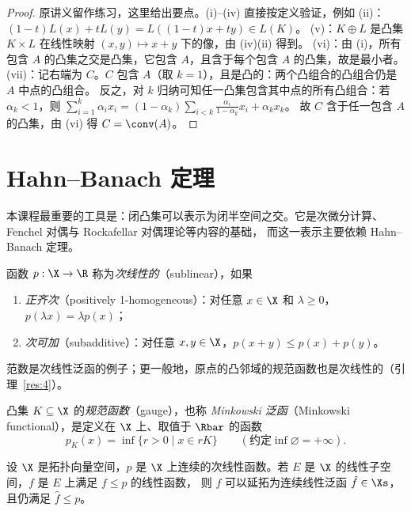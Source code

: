 \begin{proof}
原讲义留作练习，这里给出要点。(i)--(iv) 直接按定义验证，例如 (ii)：$(1-t)L(x)+tL(y)=L((1-t)x+ty)\in L(K)$。
(v)：$K\oplus L$ 是凸集 $K\times L$ 在线性映射 $(x,y)\mapsto x+y$ 下的像，由 (iv)(ii) 得到。
(vi)：由 (i)，所有包含 $A$ 的凸集之交是凸集，它包含 $A$，且含于每个包含 $A$ 的凸集，故是最小者。
(vii)：记右端为 $C$。$C$ 包含 $A$（取 $k=1$），且是凸的：两个凸组合的凸组合仍是 $A$ 中点的凸组合。
反之，对 $k$ 归纳可知任一凸集包含其中点的所有凸组合：若 $\alpha_k<1$，则
$\sum_{i=1}^k\alpha_ix_i=(1-\alpha_k)\sum_{i<k}\frac{\alpha_i}{1-\alpha_k}x_i+\alpha_kx_k$。
故 $C$ 含于任一包含 $A$ 的凸集，由 (vi) 得 $C=\conv(A)$。
\end{proof}

\section{Hahn--Banach 定理}

本课程最重要的工具是：闭凸集可以表示为闭半空间之交。它是次微分计算、Fenchel 对偶与 Rockafellar 对偶理论等内容的基础，
而这一表示主要依赖 Hahn--Banach 定理。

\begin{definition}[次线性]
\label{def:4}
函数 $p:\X\to\R$ 称为\emph{次线性的}（sublinear），如果
\begin{enumerate}[label=(\roman*)]
  \item \emph{正齐次}（positively 1-homogeneous）：对任意 $x\in\X$ 和 $\lambda\geqslant0$，$p(\lambda x)=\lambda p(x)$；
  \item \emph{次可加}（subadditive）：对任意 $x,y\in\X$，$p(x+y)\leqslant p(x)+p(y)$。
\end{enumerate}
\end{definition}

范数是次线性泛函的例子；更一般地，原点的凸邻域的规范函数也是次线性的（引理~\ref{res:4}）。

\begin{definition}[规范函数]
\label{def:5}
凸集 $K\subseteq\X$ 的\emph{规范函数}（gauge），也称 \emph{Minkowski 泛函}（Minkowski functional），是定义在 $\X$ 上、取值于 $\Rbar$ 的函数
\[
  p_K(x)=\inf\{r>0\mid x\in rK\}\qquad(\text{约定}\inf\varnothing=+\infty).
\]
\end{definition}

\begin{theorem}
\label{res:2}
设 $\X$ 是拓扑向量空间，$p$ 是 $\X$ 上连续的次线性函数。若 $E$ 是 $\X$ 的线性子空间，$f$ 是 $E$ 上满足 $f\leqslant p$ 的线性函数，
则 $f$ 可以延拓为连续线性泛函 $\hat f\in\Xs$，且仍满足 $\hat f\leqslant p$。
\end{theorem}

